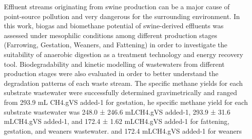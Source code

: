 Effluent streams originating from swine production can be a major cause of point-source pollution and very dangerous for the surrounding environment. In this work, biogas and biomethane potential of swine-derived effluents was assessed under mesophilic conditions among different production stages (Farrowing, Gestation, Weaners, and Fattening) in order to investigate the suitability of anaerobic digestion as a treatment technology and energy recovery tool. Biodegradability and kinetic modelling of wastewaters from different production stages were also evaluated in order to better understand the degradation patterns of each waste stream. The specific methane yields for each substrate wastewater were successfully determined gravimetrically and ranged from 293.9 mL CH4.gVS added-1 for gestation, he specific methane yield for each substrate wastewater was 248.0 ± 246.6 mLCH4.gVS added-1, 293.9 ± 31.6 mLCH4.gVS added-1, and 172.4 ± 1.62 mLCH4.gVS added-1 for fattening, gestation, and weaners wastewater. and 172.4 mLCH4.gVS added-1 for weaners